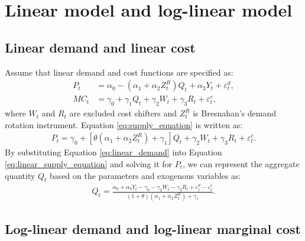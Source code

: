 \documentclass[11pt, a4paper]{article}
\begin{document}

\section{Linear model and log-linear model}

\subsection{Linear demand and linear cost}
Assume that linear demand and cost functions are specified as:
\begin{align}
    P_t &= \alpha_0 - (\alpha_1 + \alpha_2Z^{R}_{t})Q_t + \alpha_3 Y_t + \varepsilon^{d}_{t},\label{eq:linear_demand}\\
    MC_t &= \gamma_0  + \gamma_1 Q_{t} + \gamma_2 W_{t} + \gamma_3 R_t + \varepsilon^{c}_{t},\label{eq:linear_marginal_cost}
\end{align}
where $W_{t}$ and $R_t$ are excluded cost shifters and $Z^{R}_{t}$ is Bresnahan's demand rotation instrument. 
Equation \eqref{eq:supply_equation} is written as:
\begin{align}
    P_t = \gamma_0 + [\theta(\alpha_1 + \alpha_2Z^{R}_{t})+ \gamma_1] Q_t   + \gamma_2 W_{t} + \gamma_3 R_t + \varepsilon^{c}_{t}.\label{eq:linear_supply_equation}
\end{align}
By substituting Equation \eqref{eq:linear_demand} into Equation \eqref{eq:linear_supply_equation} and solving it for $P_t$, we can represent the aggregate quantity $Q_t$ based on the parameters and exogenous variables as:
\begin{align}
    Q_t =  \frac{\alpha_0 + \alpha_3 Y_t - \gamma_0 - \gamma_2 W_{t} - \gamma_3 R_t + \varepsilon^{d}_{t} - \varepsilon^{c}_{t}}{(1 + \theta) (\alpha_1 + \alpha_2 Z^{R}_{t}) + \gamma_1}.\label{eq:quantity_linear}
\end{align}


\subsection{Log-linear demand and log-linear marginal cost}
\end{document}
